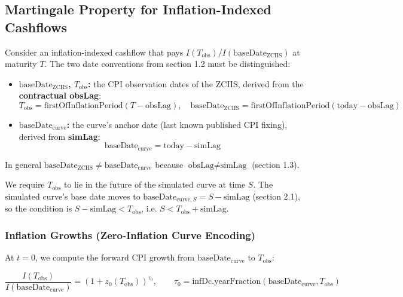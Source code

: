 \documentclass[11pt,a4paper]{article}
\begin{document}
\subsection{Martingale Property for Inflation-Indexed Cashflows}

Consider an inflation-indexed cashflow that pays $I(T_{\text{obs}}) / I(\text{baseDate}_{\text{ZCIIS}})$ at maturity $T$. The two date conventions from section 1.2 must be distinguished:

\begin{itemize}[leftmargin=*]
\item \textbf{$\text{baseDate}_{\text{ZCIIS}}$, $T_{\text{obs}}$:} the CPI observation dates of the ZCIIS, derived from the \textbf{contractual obsLag}:
\begin{equation}
T_{\text{obs}} = \text{firstOfInflationPeriod}(T - \text{obsLag}), \quad \text{baseDate}_{\text{ZCIIS}} = \text{firstOfInflationPeriod}(\text{today} - \text{obsLag})
\end{equation}

\item \textbf{$\text{baseDate}_{\text{curve}}$:} the curve's anchor date (last known published CPI fixing), derived from \textbf{simLag}:
\begin{equation}
\text{baseDate}_{\text{curve}} = \text{today} - \text{simLag}
\end{equation}
\end{itemize}

In general $\text{baseDate}_{\text{ZCIIS}} \neq \text{baseDate}_{\text{curve}}$ because $\text{obsLag} \neq \text{simLag}$ (section 1.3).

We require $T_{\text{obs}}$ to lie in the future of the simulated curve at time $S$. The simulated curve's base date moves to $\text{baseDate}_{\text{curve},S} = S - \text{simLag}$ (section 2.1), so the condition is $S - \text{simLag} < T_{\text{obs}}$, i.e. $S < T_{\text{obs}} + \text{simLag}$.

\subsubsection{Inflation Growths (Zero-Inflation Curve Encoding)}

At $t=0$, we compute the forward CPI growth from $\text{baseDate}_{\text{curve}}$ to $T_{\text{obs}}$:

\begin{equation}
\frac{I(T_{\text{obs}})}{I(\text{baseDate}_{\text{curve}})} = (1 + z_0(T_{\text{obs}}))^{\tau_0}, \qquad \tau_0 = \text{infDc.yearFraction}(\text{baseDate}_{\text{curve}}, T_{\text{obs}})
\end{equation}
\end{document}

